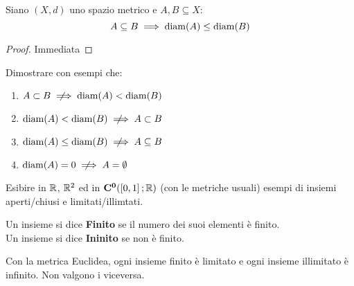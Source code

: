 \begin{proposition}
	Siano $(X,d)$ uno spazio metrico e $A,B\subseteq X$:
	$$A \subseteq B \implies \operatorname{diam}(A) \leq \operatorname{diam}(B)$$
	\begin{proof}
		Immediata %
	\end{proof}
\end{proposition}
\begin{exercise}
	Dimostrare con esempi che:
	\begin{enumerate}
		\item $A \subset B \notimplies \diam(A) < \diam(B)$
		\item $\diam(A) < \diam(B) \notimplies A \subset B$
		\item $\diam(A) \leq \diam(B) \notimplies A \subseteq B$
		\item $\diam(A) = 0 \notimplies A = \emptyset$ %
	\end{enumerate}
\end{exercise}
\begin{exercise}
	Esibire in $\mathbb{R}$, $\mathbb{R}^2$ ed in $\mathbf{C^{0}}(\left[0,1\right]; \mathbb{R})$ (con le metriche usuali) esempi di insiemi aperti/chiusi e limitati/illimtati.
\end{exercise}

\begin{definition}
	Un insieme si dice \textbf{Finito} se il numero dei suoi elementi è finito.\\
	Un insieme si dice \textbf{Ininito} se non è finito.
\end{definition}
\begin{observation}
	Con la metrica Euclidea, ogni insieme finito è limitato e ogni insieme illimitato è infinito. Non valgono i viceversa.
\end{observation}


